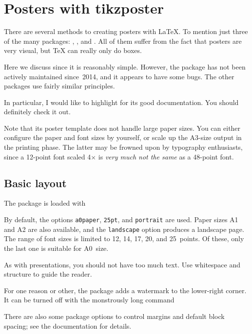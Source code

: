 \chapter{Posters with tikzposter}

There are several methods to creating posters with \LaTeX{}.
To mention just three of the many packages: , , and .
All of them suffer from the fact that posters are very visual,
but \TeX{} can really only do boxes.

Here we discuss  since it is reasonably simple.
However, the package has not been actively maintained since~2014,
and it appears to have some bugs.
The other packages use fairly similar principles.

\begin{remark}
In particular, I would like to highlight  for its good documentation.
You should definitely check it out.

Note that its poster template does not handle large paper sizes.
You can either configure the paper and font sizes by yourself,
or scale up the A3-size output in the printing phase.
The latter may be frowned upon by typography enthusiasts,
since a 12-point font scaled 4$\times$ is \emph{very much not the same} as a 48-point font.
\end{remark}


%
%
\section{Basic layout}

The package is loaded with
%
%
By default, the options \verb|a0paper|, \verb|25pt|, and \verb|portrait| are used.
Paper sizes A1 and A2 are also available, and the \verb|landscape| option produces a landscape page.
The range of font sizes is limited to 12, 14, 17, 20, and 25~points.
Of these, only the last one is suitable for A0~size.

\begin{practices}
As with presentations, you should not have too much text.
Use whitespace and structure to guide the reader.
\end{practices}

For one reason or other, the package adds a watermark to the lower-right corner.
It can be turned off with the monstrously long command
%
\begin{ExampleCode}
\tikzposterlatexaffectionproofoff
\end{ExampleCode}
%
There are also some package options to control margins and default block spacing;
see the documentation for details.

